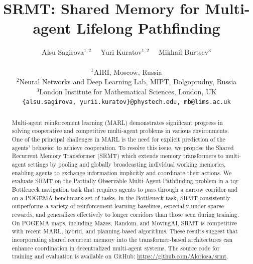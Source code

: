 \documentclass{article} %
\title{SRMT: Shared Memory for Multi-agent Lifelong Pathfinding}
\author{
Alsu Sagirova$^{1,2}$ \ \ 
Yuri Kuratov$^{1,2}$ \ \ 
Mikhail Burtsev$^3$ \\ \\
$^1$AIRI, Moscow, Russia \\ 
$^2$Neural Networks and Deep Learning Lab, MIPT, Dolgoprudny, Russia \\
$^3$London Institute for Mathematical Sciences, London, UK \\
\texttt{\{alsu.sagirova,\ yurii.kuratov\}@phystech.edu, mb@lims.ac.uk}
}
\begin{document}
\maketitle

\begin{abstract}


Multi-agent reinforcement learning (MARL) demonstrates significant progress in solving cooperative and competitive multi-agent problems in various environments. One of the principal challenges in MARL is the need for explicit prediction of the agents' behavior to achieve cooperation. To resolve this issue, we propose the Shared Recurrent Memory Transformer (SRMT) which extends memory transformers to multi-agent settings by pooling and globally broadcasting individual working memories, enabling agents to exchange information implicitly and coordinate their actions. We evaluate SRMT on the Partially Observable Multi-Agent Pathfinding problem in a toy Bottleneck navigation task that requires agents to pass through a narrow corridor and on a POGEMA benchmark set of tasks. In the Bottleneck task, SRMT consistently outperforms a variety of reinforcement learning baselines, especially under sparse rewards, and generalizes effectively to longer corridors than those seen during training. On POGEMA maps,  including Mazes, Random, and MovingAI, SRMT is competitive with recent MARL, hybrid, and planning-based algorithms. These results suggest that incorporating shared recurrent memory into the transformer-based architectures can enhance coordination in decentralized multi-agent systems. The source code for training
and evaluation is available on GitHub: \url{https://github.com/Aloriosa/srmt}.



\end{abstract}
\end{document}

